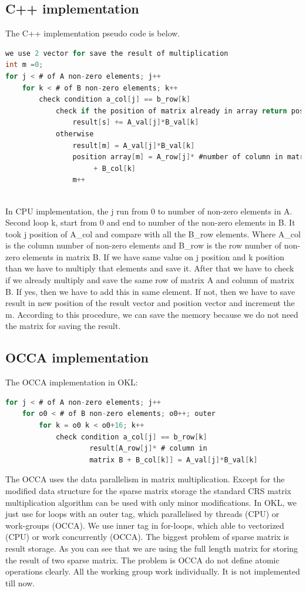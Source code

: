 \subsection{C++ implementation}
The C++ implementation pseudo code is below.
\begin{lstlisting}[language=C, caption=matrix multiplication in C++]
we use 2 vector for save the result of multiplication
int m =0;
for j < # of A non-zero elements; j++
	for k < # of B non-zero elements; k++
		check condition a_col[j] == b_row[k]
			check if the position of matrix already in array return position s
				result[s] += A_val[j]*B_val[k]
			otherwise
				result[m] = A_val[j]*B_val[k]
				position array[m] = A_row[j]* #number of column in matrix B
					 + B_col[k]
				m++
				
\end{lstlisting}
In CPU implementation, the j run from 0 to number of non-zero elements in A. Second loop k, start from 0 and end to number of the non-zero elements in B. It took j position of A\_col and compare with all the B\_row elements. Where A\_col is the column number of non-zero elements and B\_row is the row number of non-zero elements in matrix B. If we have same value on j position and k position than we have to multiply that elements and save it. After that we have to check if we already multiply and save the same row of matrix A and column of matrix B. If yes, then we have to add this in same element. If not, then we have to save result in new position of the result vector and position vector and increment the m. According to this procedure, we can save the memory because we do not need the matrix for saving the result.

\subsection{OCCA implementation}
The OCCA implementation in OKL:\\
\begin{lstlisting}[language=C, caption=matrix multiplication in OCCA]
for j < # of A non-zero elements; j++
	for o0 < # of B non-zero elements; o0++; outer
		for k = o0 k < o0+16; k++
			check condition a_col[j] == b_row[k]
					result[A_row[j]* # column in 
					matrix B + B_col[k]] = A_val[j]*B_val[k]
\end{lstlisting}
The OCCA uses the data parallelism in matrix multiplication. Except for the modified data structure for the sparse matrix storage the standard CRS matrix multiplication algorithm can be used with only minor modifications. In OKL, we just use for loops with an outer tag, which parallelised by threads (CPU) or work-groups (OCCA). We use inner tag in for-loops, which able to vectorized (CPU) or work concurrently (OCCA). The biggest problem of sparse matrix is result storage. As you can see that we are using the full length matrix for storing the result of two sparse matrix. The problem is OCCA do not define atomic operations clearly. All the working group work individually. It is not implemented till now.
